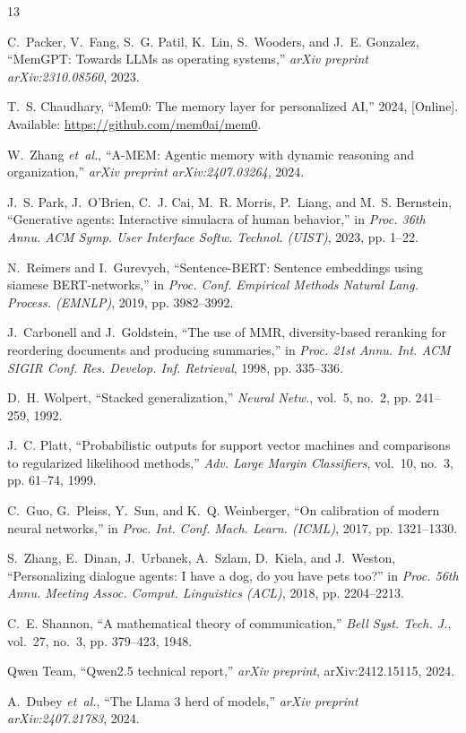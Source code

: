 \documentclass[journal]{IEEEtran}
\begin{document}
\begin{thebibliography}{13}

C.~Packer, V.~Fang, S.~G. Patil, K.~Lin, S.~Wooders, and J.~E. Gonzalez, ``{MemGPT}: Towards {LLMs} as operating systems,'' \emph{arXiv preprint arXiv:2310.08560}, 2023.

T.~S. Chaudhary, ``Mem0: The memory layer for personalized {AI},'' 2024, [Online]. Available: \url{https://github.com/mem0ai/mem0}.

W.~Zhang \emph{et~al.}, ``{A-MEM}: Agentic memory with dynamic reasoning and organization,'' \emph{arXiv preprint arXiv:2407.03264}, 2024.

J.~S. Park, J.~O'Brien, C.~J. Cai, M.~R. Morris, P.~Liang, and M.~S. Bernstein, ``Generative agents: Interactive simulacra of human behavior,'' in \emph{Proc. 36th Annu. ACM Symp. User Interface Softw. Technol. (UIST)}, 2023, pp. 1--22.

N.~Reimers and I.~Gurevych, ``{Sentence-BERT}: Sentence embeddings using siamese {BERT}-networks,'' in \emph{Proc. Conf. Empirical Methods Natural Lang. Process. (EMNLP)}, 2019, pp. 3982--3992.

J.~Carbonell and J.~Goldstein, ``The use of {MMR}, diversity-based reranking for reordering documents and producing summaries,'' in \emph{Proc. 21st Annu. Int. ACM SIGIR Conf. Res. Develop. Inf. Retrieval}, 1998, pp. 335--336.

D.~H. Wolpert, ``Stacked generalization,'' \emph{Neural Netw.}, vol.~5, no.~2, pp. 241--259, 1992.

J.~C. Platt, ``Probabilistic outputs for support vector machines and comparisons to regularized likelihood methods,'' \emph{Adv. Large Margin Classifiers}, vol.~10, no.~3, pp. 61--74, 1999.

C.~Guo, G.~Pleiss, Y.~Sun, and K.~Q. Weinberger, ``On calibration of modern neural networks,'' in \emph{Proc. Int. Conf. Mach. Learn. (ICML)}, 2017, pp. 1321--1330.

S.~Zhang, E.~Dinan, J.~Urbanek, A.~Szlam, D.~Kiela, and J.~Weston, ``Personalizing dialogue agents: I have a dog, do you have pets too?'' in \emph{Proc. 56th Annu. Meeting Assoc. Comput. Linguistics (ACL)}, 2018, pp. 2204--2213.

C.~E. Shannon, ``A mathematical theory of communication,'' \emph{Bell Syst. Tech. J.}, vol.~27, no.~3, pp. 379--423, 1948.

Qwen Team, ``Qwen2.5 technical report,'' \emph{arXiv preprint}, arXiv:2412.15115, 2024.

A.~Dubey \emph{et~al.}, ``The {Llama} 3 herd of models,'' \emph{arXiv preprint arXiv:2407.21783}, 2024.

\end{thebibliography}
\end{document}
